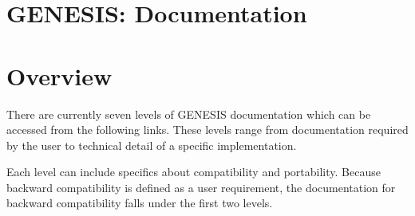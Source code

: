 \documentclass[12pt]{article}
\begin{document}
\section*{GENESIS: Documentation}

\section*{Overview}

There are currently seven levels of GENESIS documentation which can be
accessed from the following links.  These levels range from documentation required by the user to technical detail of a specific implementation.

Each level can include specifics about compatibility and
portability.  Because backward compatibility is
defined as a user requirement, the documentation for backward
compatibility falls under the first two levels.
\end{document}
